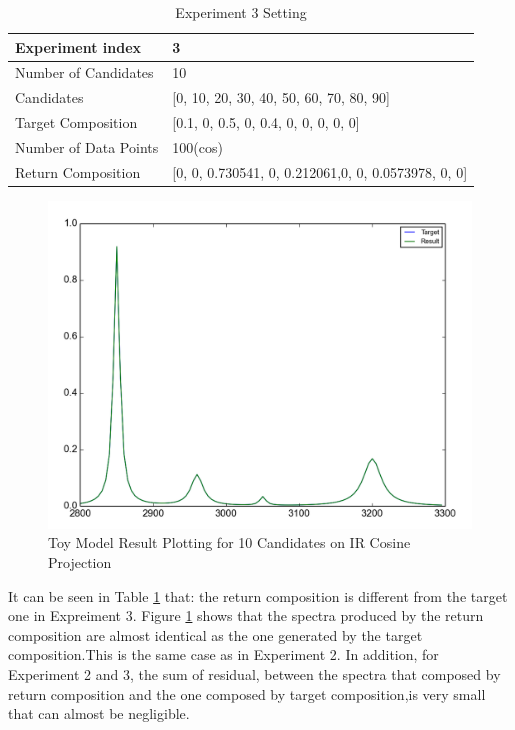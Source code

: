 \begin{table} \label{tab:3.2}
\begin{center}
\begin{tabular}{| l | p{7cm} | }
\hline
Experiment index & 3  \\
\hline
Number of Candidates & 10   \\
\hline
Candidates & [0, 10, 20, 30, 40, 50, 60, 70, 80, 90]  \\
\hline
Target Composition & [0.1, 0, 0.5, 0, 0.4, 0, 0, 0, 0, 0] \\
\hline
Number of Data Points & 100(cos) \\
\hline
Return Composition & [0, 0, 0.730541, 0, 0.212061,0, 0, 0.0573978, 0, 0] \\
\hline
\end{tabular}
\end{center}
\caption{Experiment 3 Setting}
\end{table}	

\begin{figure}[!ht] \label{fig:3.3}
\centering
\includegraphics[scale=0.3]{Figures/toy_model_result_plotting_ir_cos_10candi_1.png} 
\caption{Toy Model Result Plotting for 10 Candidates on IR Cosine Projection}
\end{figure}

It can be seen in Table \ref{tab:3.2} that: the return composition is different from the target one in Expreiment 3. Figure \ref{fig:3.3} shows that the spectra produced by the return composition are almost identical as the one generated by the target composition.This is the same case as in Experiment 2. In addition, for Experiment 2 and 3, the sum of residual, between the spectra that composed by return composition and the one composed by target composition,is very small that can almost be negligible. \\


